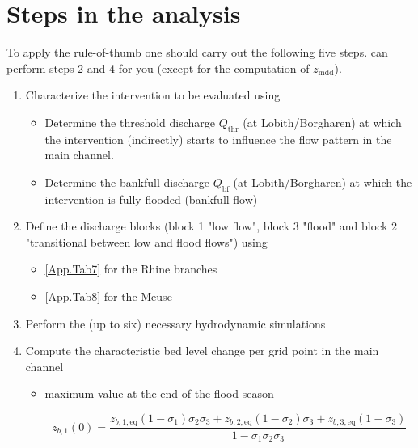 \section{Steps in the analysis}

To apply the rule-of-thumb one should carry out the following five steps.
\dfastmi can perform steps 2 and 4 for you (except for the computation of $z_\text{mdd}$).

\begin{enumerate}
\item Characterize the intervention to be evaluated using \dfastmi

\begin{itemize}
\item Determine the threshold discharge $Q_\text{thr}$ (at Lobith/Borgharen) at which the intervention (indirectly) starts to influence the flow pattern in the main channel.

\item Determine the bankfull discharge $Q_\text{bf}$ (at Lobith/Borgharen) at which the intervention is fully flooded (bankfull flow)
\end{itemize}

\item Define the discharge blocks (block 1 "low flow", block 3 "flood" and block 2 "transitional between low and flood flows") using

\begin{itemize}
\item \autoref{App.Tab7} for the Rhine branches
\item \autoref{App.Tab8} for the Meuse
\end{itemize}

\item Perform the (up to six) necessary hydrodynamic simulations

\item Compute the characteristic bed level change per grid point in the main channel

\begin{itemize}
\item maximum value \unitbrackets{\SI{}{\metre}} at the end of the flood season

\begin{equation}
z_{b,1}(0) = \frac{z_{b,1,\text{eq}} (1-\sigma_1) \sigma_2 \sigma_3 + z_{b,2,\text{eq}} (1-\sigma_2) \sigma_3 + z_{b,3,\text{eq}} (1-\sigma_3)}{1 - \sigma_1 \sigma_2 \sigma_3}
\end{equation}


\end{itemize}
\end{enumerate}
